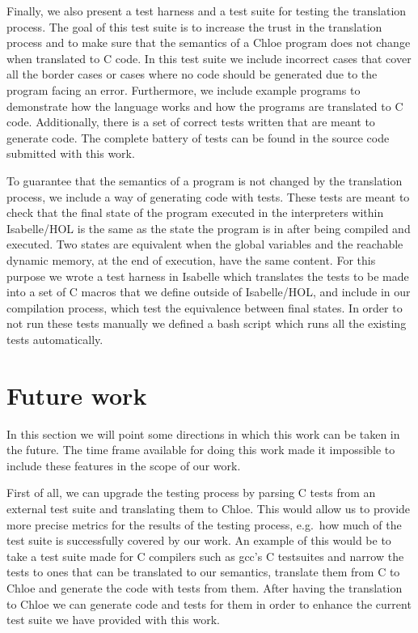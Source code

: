 Finally, we also present a test harness and a test suite for testing the translation process.
The goal of this test suite is to increase the trust in the translation process and to make sure that the semantics of a Chloe program does not change when translated to C code.
In this test suite we include incorrect cases that cover all the border cases or cases where no code should be generated due to the program facing an error.
Furthermore, we include example programs to demonstrate how the language works and how the programs are translated to C code.
Additionally, there is a set of correct tests written that are meant to generate code.
The complete battery of tests can be found in the source code submitted with this work.

To guarantee that the semantics of a program is not changed by the translation process, we include a way of generating code with tests.
These tests are meant to check that the final state of the program executed in the interpreters within Isabelle/HOL is the same as the state the program is in after being compiled and executed.
Two states are equivalent when the global variables and the reachable dynamic memory, at the end of execution, have the same content.
For this purpose we wrote a test harness in Isabelle which translates the tests to be made into a set of C macros that we define outside of Isabelle/HOL, and include in our compilation process, which test the equivalence between final states.
In order to not run these tests manually we defined a bash script which runs all the existing tests automatically.

\section{Future work}

In this section we will point some directions in which this work can be taken in the future.
The time frame available for doing this work made it impossible to include these features in the scope of our work.

First of all, we can upgrade the testing process by parsing C tests from an external test suite and translating them to Chloe.
This would allow us to provide more precise metrics for the results of the testing process, e.g.\ how much of the test suite is successfully covered by our work.
An example of this would be to take a test suite made for C compilers such as gcc's C testsuites\cite{gcc-tests} and narrow the tests to ones that can be translated to our semantics, translate them from C to Chloe and generate the code with tests from them.
After having the translation to Chloe we can generate code and tests for them in order to enhance the current test suite we have provided with this work.

